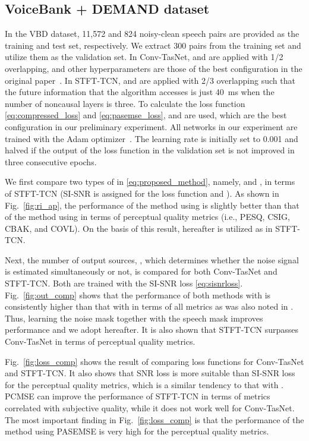 \documentclass[a4paper]{article}
\begin{document}
\begin{spacing}{0.915}
\subsection{VoiceBank + DEMAND dataset}
In the VBD dataset, 11,572 and 824 noisy-clean speech pairs are provided as the training and test set, respectively.
We extract 300 pairs from the training set and utilize them as the validation set.
In Conv-TasNet,  and  are applied with 1/2 overlapping, and other hyperparameters are those of the best configuration in the original paper~\cite{luo2019conv}.
In STFT-TCN,  and  are applied with 2/3 overlapping such that the future information that the algorithm accesses is just 40~ms when the number of noncausal layers is three.
To calculate the loss function \eqref{eq:compressed_loss} and \eqref{eq:pasemse_loss},  and  are used, which are the best configuration in our preliminary experiment.
All networks in our experiment are trained with the Adam optimizer~\cite{kingma2014adam}.
The learning rate is initially set to 0.001 and halved if the output of the loss function in the validation set is not improved in three consecutive epochs.

We first compare two types of  in \eqref{eq:proposed_method}, namely,  and , in terms of STFT-TCN (SI-SNR is assigned for the loss function and ).
As shown in Fig.~\ref{fig:ri_ap}, 
the performance of the method using  is slightly better than that of the method using  in terms of perceptual quality metrics (i.e., PESQ, CSIG, CBAK, and COVL).
On the basis of this result, hereafter  is utilized as  in STFT-TCN.


Next, the number of output sources, , which determines whether the noise signal is estimated simultaneously or not, is compared for both Conv-TasNet and STFT-TCN.
Both are trained with the SI-SNR loss \eqref{eq:sisnrloss}.
Fig.~\ref{fig:out_comp} shows that 
the performance of both methods with  is consistently higher than that with  in terms of all metrics as was also noted in \cite{kinoshita2020improving}.
Thus, learning the noise mask together with the speech mask improves performance and we adopt  hereafter.
It is also shown that
STFT-TCN surpasses Conv-TasNet in terms of perceptual quality metrics.

Fig.~\ref{fig:loss_comp} shows the result of comparing loss functions for Conv-TasNet and STFT-TCN.
It also shows that SNR loss is more suitable than SI-SNR loss for the perceptual quality metrics, which is a similar tendency to that with \cite{kinoshita2020improving}.
PCMSE can improve the performance of STFT-TCN in terms of metrics correlated with subjective quality, while it does not work well for Conv-TasNet.
The most important finding in Fig.~\ref{fig:loss_comp} is that 
the performance of the method using PASEMSE is very high for the perceptual quality metrics.


\end{spacing}
\end{document}
